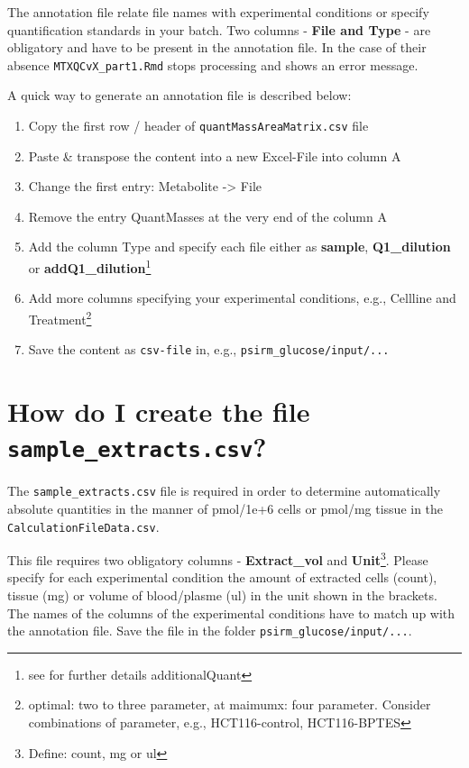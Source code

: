 \documentclass[]{book}
\providecommand{\tightlist}{%
  \setlength{\itemsep}{0pt}\setlength{\parskip}{0pt}}
\let\rmarkdownfootnote\footnote%
\def\footnote{\protect\rmarkdownfootnote}
\begin{document}
The annotation file relate file names with experimental conditions or specify quantification standards in your batch. Two columns - \textbf{File and Type} - are obligatory and have to be present in the annotation file. In the case of their absence \texttt{MTXQCvX\_part1.Rmd} stops processing and shows an error message.

A quick way to generate an annotation file is described below:

\begin{enumerate}
\def\labelenumi{\arabic{enumi}.}
\tightlist
\item
  Copy the first row / header of \texttt{quantMassAreaMatrix.csv} file
\item
  Paste \& transpose the content into a new Excel-File into column A
\item
  Change the first entry: Metabolite -\textgreater{} File
\item
  Remove the entry QuantMasses at the very end of the column A
\item
  Add the column Type and specify each file either as \textbf{sample}, \textbf{Q1\_dilution} or \textbf{addQ1\_dilution}\footnote{see for further details additionalQuant}
\item
  Add more columns specifying your experimental conditions, e.g., Cellline and Treatment\footnote{optimal: two to three parameter, at maimumx: four parameter. Consider combinations of parameter, e.g., HCT116-control, HCT116-BPTES}
\item
  Save the content as \texttt{csv-file} in, e.g., \texttt{psirm\_glucose/input/...}
\end{enumerate}

\hypertarget{createsampleextracts}{%
\section{\texorpdfstring{How do I create the file \texttt{sample\_extracts.csv}?}{How do I create the file sample\_extracts.csv?}}\label{createsampleextracts}}

The \texttt{sample\_extracts.csv} file is required in order to determine automatically absolute quantities in the manner of pmol/1e+6 cells or pmol/mg tissue in the \texttt{CalculationFileData.csv}.

This file requires two obligatory columns - \textbf{Extract\_vol} and \textbf{Unit}\footnote{Define: count, mg or ul}. Please specify for each experimental condition the amount of extracted cells (count), tissue (mg) or volume of blood/plasme (ul) in the unit shown in the brackets.\\
The names of the columns of the experimental conditions have to match up with the annotation file. Save the file in the folder \texttt{psirm\_glucose/input/...}.
\end{document}
